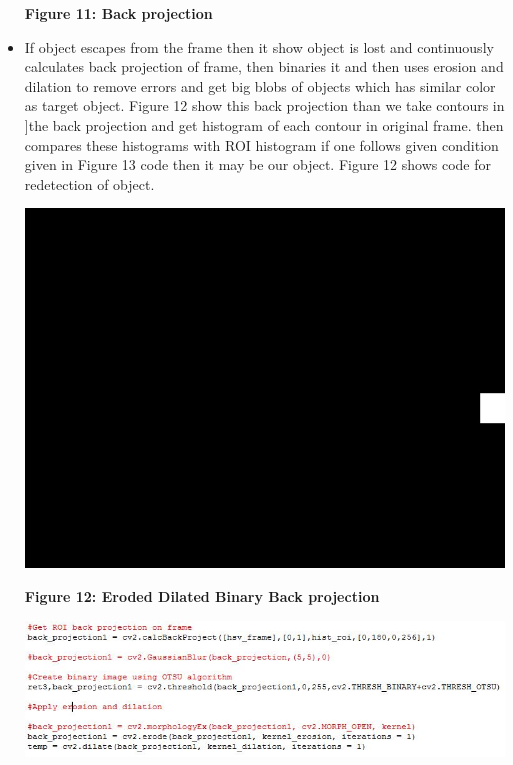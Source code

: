\documentclass[11pt,a4paper]{article}
\begin{document}
\begin{itemize}
\begin{center}
				 \end{center}
				 \begin{center}
				 	\textbf{Figure 11: Back projection}
				 \end{center}
			 \item If object escapes from the frame then it show object is lost and continuously calculates back projection of frame, then binaries it and then uses erosion and dilation to remove errors and get big blobs of objects which has similar color as target object. Figure 12 show this back projection than we take contours in ]the back projection and get histogram of each contour in original frame. then compares these histograms with ROI histogram if one follows given condition given in Figure 13 code then it may be our object. Figure 12 shows code for redetection of object.
				 \begin{center}
				 	\includegraphics[scale=0.6]{special_back_projection.JPG}
				 \end{center}
				 \begin{center}
				 	\textbf{Figure 12: Eroded Dilated Binary Back projection}
				 \end{center}
				 \begin{center}
				 	\includegraphics[scale=0.8]{redetection_back_projection.JPG}

\end{center}
\end{itemize}
\end{document}
